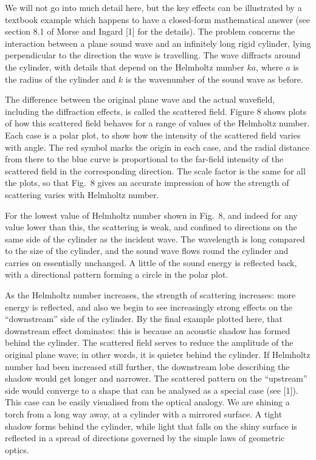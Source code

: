   We will not go into much detail here, but the key effects can be illustrated 
  by a textbook example which happens to have a closed-form mathematical answer 
  (see section 8.1 of Morse and Ingard [1] for the details). The problem 
  concerns the interaction between a plane sound wave and an infinitely long 
  rigid cylinder, lying perpendicular to the direction the wave is travelling. 
  The wave diffracts around the cylinder, with details that depend on the 
  Helmholtz number $ka$, where $a$ is the radius of the cylinder and $k$ is the 
  wavenumber of the sound wave as before. 

  The difference between the original plane wave and the actual wavefield, 
  including the diffraction effects, is called the scattered field. Figure 8 
  shows plots of how this scattered field behaves for a range of values of the 
  Helmholtz number. Each case is a polar plot, to show how the intensity of the 
  scattered field varies with angle. The red symbol marks the origin in each 
  case, and the radial distance from there to the blue curve is proportional to 
  the far-field intensity of the scattered field in the corresponding 
  direction. The scale factor is the same for all the plots, so that Fig.\ 8 
  gives an accurate impression of how the strength of scattering varies with 
  Helmholtz number. 

  For the lowest value of Helmholtz number shown in Fig.\ 8, and indeed for any 
  value lower than this, the scattering is weak, and confined to directions on 
  the same side of the cylinder as the incident wave. The wavelength is long 
  compared to the size of the cylinder, and the sound wave flows round the 
  cylinder and carries on essentially unchanged. A little of the sound energy 
  is reflected back, with a directional pattern forming a circle in the polar 
  plot. 

  As the Helmholtz number increases, the strength of scattering increases: more 
  energy is reflected, and also we begin to see increasingly strong effects on 
  the ``downstream'' side of the cylinder. By the final example plotted here, 
  that downstream effect dominates: this is because an acoustic shadow has 
  formed behind the cylinder. The scattered field serves to reduce the 
  amplitude of the original plane wave; in other words, it is quieter behind 
  the cylinder. If Helmholtz number had been increased still further, the 
  downstream lobe describing the shadow would get longer and narrower. The 
  scattered pattern on the ``upstream'' side would converge to a shape that can 
  be analysed as a special case (see [1]). This case can be easily visualised 
  from the optical analogy. We are shining a torch from a long way away, at a 
  cylinder with a mirrored surface. A tight shadow forms behind the cylinder, 
  while light that falls on the shiny surface is reflected in a spread of 
  directions governed by the simple laws of geometric optics. 

